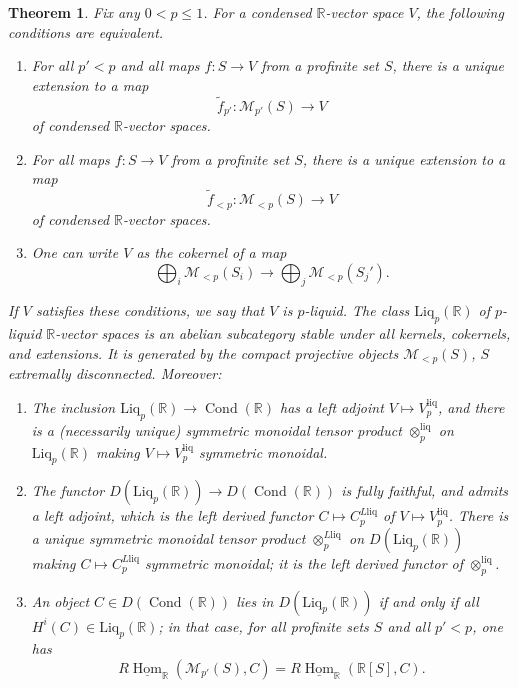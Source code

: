 \documentclass[11pt]{amsbook}
\DeclareMathOperator{\Hom}{Hom}
\newcommand{\intHom}{\underline{\Hom}}
\DeclareMathOperator{\Cond}{Cond}
\renewcommand*{\tilde}{\widetilde}
\numberwithin{equation}{section}
\newtheorem{theorem}{Theorem}
\numberwithin{theorem}{section}
\theoremstyle{definition}
\begin{document}
\begin{theorem}\label{thm:pliquid} Fix any $0<p\leq 1$. For a condensed $\mathbb R$-vector space $V$, the following conditions are equivalent.
\begin{enumerate}
\item For all $p'<p$ and all maps $f: S\to V$ from a profinite set $S$, there is a unique extension to a map
\[
\tilde{f}_{p'}: \mathcal M_{p'}(S)\to V
\]
of condensed $\mathbb R$-vector spaces.
\item For all maps $f: S\to V$ from a profinite set $S$, there is a unique extension to a map
\[
\tilde{f}_{<p}: \mathcal M_{<p}(S)\to V
\]
of condensed $\mathbb R$-vector spaces.
\item One can write $V$ as the cokernel of a map
\[
\bigoplus_i \mathcal M_{<p}(S_i)\to \bigoplus_j \mathcal M_{<p}(S_j').
\]
\end{enumerate}

If $V$ satisfies these conditions, we say that $V$ is $p$-liquid. The class $\mathrm{Liq}_p(\mathbb R)$ of $p$-liquid $\mathbb R$-vector spaces is an abelian subcategory stable under all kernels, cokernels, and extensions. It is generated by the compact projective objects $\mathcal M_{<p}(S)$, $S$ extremally disconnected. Moreover:
\begin{enumerate}
\item The inclusion $\mathrm{Liq}_p(\mathbb R)\to \Cond(\mathbb R)$ has a left adjoint $V\mapsto V^{\mathrm{liq}}_p$, and there is a (necessarily unique) symmetric monoidal tensor product $\otimes^{\mathrm{liq}}_p$ on $\mathrm{Liq}_p(\mathbb R)$ making $V\mapsto V^{\mathrm{liq}}_p$ symmetric monoidal.
\item The functor $D(\mathrm{Liq}_p(\mathbb R))\to D(\Cond(\mathbb R))$ is fully faithful, and admits a left adjoint, which is the left derived functor $C\mapsto C^{L\mathrm{liq}}_p$ of $V\mapsto V^{\mathrm{liq}}_p$. There is a unique symmetric monoidal tensor product $\otimes^{L\mathrm{liq}}_p$ on $D(\mathrm{Liq}_p(\mathbb R))$ making $C\mapsto C^{L\mathrm{liq}}_p$ symmetric monoidal; it is the left derived functor of $\otimes^{\mathrm{liq}}_p$.
\item An object $C\in D(\Cond(\mathbb R))$ lies in $D(\mathrm{Liq}_p(\mathbb R))$ if and only if all $H^i(C)\in \mathrm{Liq}_p(\mathbb R)$; in that case, for all profinite sets $S$ and all $p'<p$, one has
\[
R\intHom_{\mathbb R}(\mathcal M_{p'}(S),C) = R\intHom_{\mathbb R}(\mathbb R[S],C).
\]
\end{enumerate}
\end{theorem}
\end{document}
